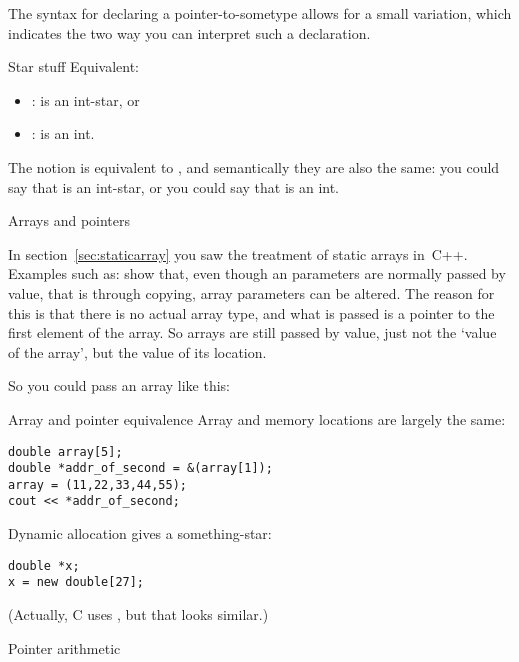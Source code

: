 The syntax for declaring a pointer-to-sometype allows for a small
variation, which indicates the two way you can interpret such a declaration.

\begin{block}{Star stuff}
  \label{sl:starstuff}
  Equivalent:
  \begin{itemize}
  \item {}:  is an int-star, or
  \item {}:  is an int.
  \end{itemize}
\end{block}

The notion  is equivalent to , and
semantically they are also the same: you could say that  is an
int-star, or you could say that  is an int.

 {Arrays and pointers}
\label{sec:arraypointer}

In section~\ref{sec:staticarray} you saw the treatment of static
arrays in~C++. Examples such as:
%
%
show that, even though an parameters are normally passed by value, that is
through copying, array parameters can be altered. The reason for this
is that there is no actual array type, and what is passed is a pointer
to the first element of the array. So arrays are still passed by
value, just not the `value of the array', but the value of its
location.

So you could pass an array like this:
%

\begin{block}{Array and pointer equivalence}
  \label{sl:array-pointer}
  Array and memory locations are largely the same:
\begin{verbatim}
double array[5];
double *addr_of_second = &(array[1]);
array = (11,22,33,44,55);
cout << *addr_of_second;
\end{verbatim}
\end{block}

\begin{block}{Dynamic allocation}
  \label{sl:newstar}
   gives a something-star:
\begin{verbatim}
double *x;
x = new double[27];
\end{verbatim}
(Actually, C uses , but that looks similar.)
\end{block}

 {Pointer arithmetic}

